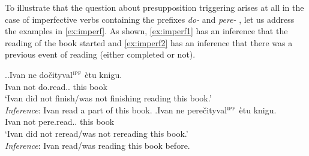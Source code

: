 
To illustrate that the question about presupposition triggering arises at all in the case of imperfective verbs  containing the prefixes \textit{do-}   and \textit{pere-}  , let us address the examples in \ref{ex:imperf}. As shown,  \ref{ex:imperf1} has an inference that the reading of the book started and \ref{ex:imperf2} has an inference that there was a previous event of reading (either completed or not).

\ex.\label{ex:imperf}\ag.\label{ex:imperf1}Ivan ne do\v{c}ityval$^{\textsc{ipf}}$ \`{e}tu knigu.\\
Ivan not do.read.. this book\\
\trans `Ivan did not finish/was not finishing reading this book.'\\
\textit{Inference}: Ivan read a part of this book.
\bg.\label{ex:imperf2}Ivan ne pere\v{c}ityval$^{\textsc{ipf}}$ \`{e}tu knigu.\\
Ivan not pere.read.. this book\\
\trans `Ivan did not reread/was not rereading this book.'\\
\textit{Inference}: Ivan read/was reading this book before.

